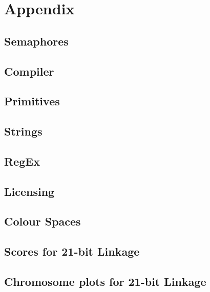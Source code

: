 \chapter{Appendix}

\section{Semaphores}\label{ref:app:semaphores}

\section{Compiler}\label{ref:app:compiler}

\section{Primitives}\label{ref:app:primitives}

\section{Strings}\label{ref:app:strings}

\section{RegEx}\label{ref:app:regex}

\section{Licensing}\label{ref:app:licensing}

\section{Colour Spaces}\label{ref:app:colour}

\section{Scores for 21-bit Linkage}\label{ref:app:21bitscores}

\section{Chromosome plots for 21-bit Linkage}\label{ref:app:21bitplots}